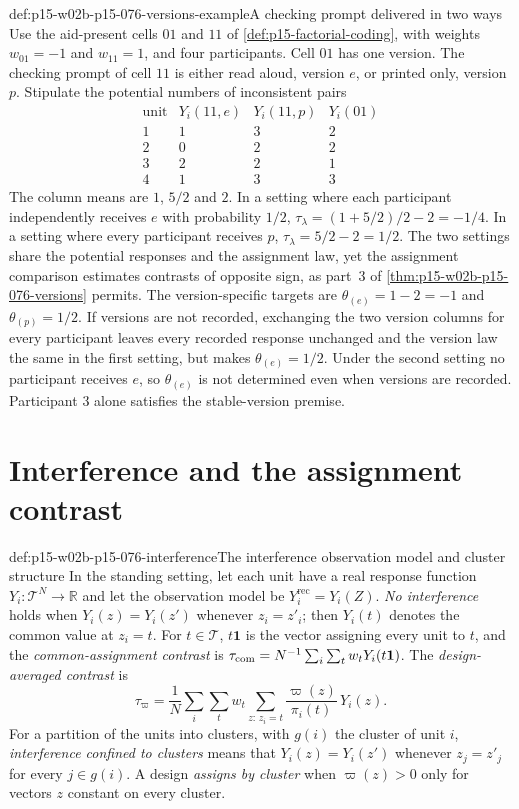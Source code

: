 \begin{hbexample}{def:p15-w02b-p15-076-versions-example}{A checking prompt delivered in two ways}
Use the aid-present cells \(01\) and \(11\) of
\cref{def:p15-factorial-coding}, with weights \(w_{01}=-1\) and
\(w_{11}=1\), and four participants. Cell \(01\) has one version. The
checking prompt of cell \(11\) is either read aloud, version \(e\), or
printed only, version \(p\). Stipulate the potential numbers of
inconsistent pairs
\[
\begin{array}{c|ccc}
 \text{unit}&Y_i(11,e)&Y_i(11,p)&Y_i(01)\\\hline
 1&1&3&2\\
 2&0&2&2\\
 3&2&2&1\\
 4&1&3&3
\end{array}
\]
The column means are \(1\), \(5/2\) and \(2\). In a setting where each
participant independently receives \(e\) with probability \(1/2\),
\(\tau_\lambda=(1+5/2)/2-2=-1/4\). In a setting where every participant
receives \(p\), \(\tau_\lambda=5/2-2=1/2\). The two settings share the
potential responses and the assignment law, yet the assignment comparison
estimates contrasts of opposite sign, as part~3 of
\cref{thm:p15-w02b-p15-076-versions} permits. The version-specific targets
are \(\theta_{(e)}=1-2=-1\) and \(\theta_{(p)}=1/2\). If versions are
not recorded, exchanging the two version columns for every participant
leaves every recorded response unchanged and the version law the same in
the first setting, but makes \(\theta_{(e)}=1/2\). Under the second
setting no participant receives \(e\), so \(\theta_{(e)}\) is not
determined even when versions are recorded. Participant \(3\) alone
satisfies the stable-version premise.
\end{hbexample}

\section{Interference and the assignment contrast}
\label{sec:p15-w02b-p15-076-interference}

\begin{hbdefinition}{def:p15-w02b-p15-076-interference}{The interference observation model and cluster structure}
In the standing setting, let each unit have a real response function
\(Y_i:\mathcal T^N\to\mathbb R\) and let the observation model be
\(Y_i^{\mathrm{rec}}=Y_i(Z)\). \emph{No interference} holds when
\(Y_i(z)=Y_i(z')\) whenever \(z_i=z'_i\); then \(Y_i(t)\) denotes the
common value at \(z_i=t\). For \(t\in\mathcal T\), \(t\mathbf 1\) is the
vector assigning every unit to \(t\), and the \emph{common-assignment
contrast} is \(\tau_{\rm com}=N^{-1}\sum_i\sum_tw_tY_i(t\mathbf 1)\).
The \emph{design-averaged contrast} is
\[
 \tau_\varpi=\frac1N\sum_i\sum_tw_t
   \sum_{z:\,z_i=t}\frac{\varpi(z)}{\pi_i(t)}\,Y_i(z).
\]
For a partition of the units into clusters, with \(g(i)\) the cluster of
unit \(i\), \emph{interference confined to clusters} means that
\(Y_i(z)=Y_i(z')\) whenever \(z_j=z'_j\) for every \(j\in g(i)\). A design
\emph{assigns by cluster} when \(\varpi(z)>0\) only for vectors \(z\)
constant on every cluster.
\end{hbdefinition}

